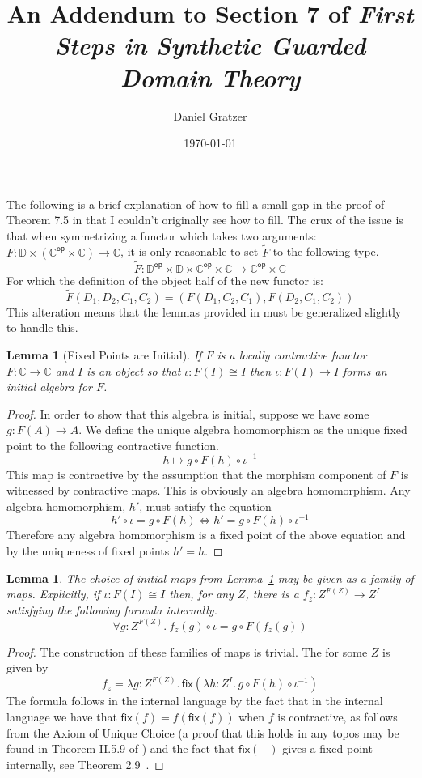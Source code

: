 \documentclass{amsart}
\title{An Addendum to Section 7 of \emph{First Steps in Synthetic
    Guarded Domain Theory}}
\author{Daniel Gratzer}
\date{\today}
\newtheorem{lem}[thm]{Lemma}
\newcommand{\Ccat}{\ensuremath{\mathbb{C}}}
\newcommand{\Dcat}{\ensuremath{\mathbb{D}}}
\newcommand{\op}[1]{\ensuremath{#1^{\mathsf{op}}}}
\newcommand{\symmetrize}[1]{\ensuremath{\widetilde{#1}}}
\newcommand{\fix}[1]{\ensuremath{\mathsf{fix}(#1)}}
\newcommand{\lam}[2]{\ensuremath{\lambda #1.\,#2}}
\begin{document}
\maketitle

The following is a brief explanation of how to fill a small gap in the
proof of Theorem 7.5 in \citet{Birkedal:11} that I couldn't originally
see how to fill. The crux of the issue is that when symmetrizing a
functor which takes two arguments:
$F : \Dcat \times (\op{\Ccat} \times \Ccat) \to \Ccat$, it is only
reasonable to set $\symmetrize{F}$ to the following type.
\[
  \symmetrize{F} : \op{\Dcat} \times \Dcat \times \op{\Ccat} \times \Ccat \to \op{\Ccat} \times \Ccat
\]
For which the definition of the object half of the new functor is:
\[
  \symmetrize{F}(D_1, D_2, C_1, C_2) = (F(D_1, C_2, C_1), F(D_2, C_1, C_2))
\]
This alteration means that the lemmas provided in \citet{Birkedal:11}
must be generalized slightly to handle this.
\begin{lem}[Fixed Points are Initial]\label{lem:initial}
  If $F$ is a locally contractive functor $F : \Ccat \to \Ccat$ and
  $I$ is an object so that $\iota : F(I) \cong I$ then
  $\iota : F(I) \to I$ forms an initial algebra for $F$.
\end{lem}
\begin{proof}
  In order to show that this algebra is initial, suppose we have some
  $g : F(A) \to A$. We define the unique algebra homomorphism as the
  unique fixed point to the following contractive function.
  \[
    h \mapsto g \circ F(h) \circ \iota^{-1}
  \]
  This map is contractive by the assumption that the morphism
  component of $F$ is witnessed by contractive maps. This is obviously
  an algebra homomorphism. Any algebra homomorphism, $h'$, must
  satisfy the equation
  \[
    h' \circ \iota = g \circ F(h) \iff
    h' = g \circ F(h) \circ \iota^{-1}
  \]
  Therefore any algebra homomorphism is a fixed point of the above
  equation and by the uniqueness of fixed points $h' = h$.
\end{proof}
\begin{lem}\label{lem:internal-choice}
  The choice of initial maps from Lemma~\ref{lem:initial} may be given
  as a family of maps. Explicitly, if $\iota : F(I) \cong I$ then, for
  any $Z$, there is a $f_z : Z^{F(Z)} \to Z^I$ satisfying the
  following formula internally.
  \[
    \forall g : Z^{F(Z)}.\ f_z(g) \circ \iota = g \circ F(f_z(g))
  \]
\end{lem}
\begin{proof}
  The construction of these families of maps is trivial. The for some
  $Z$ is given by
  \[
    f_z = \lam{g : Z^{F(Z)}}{\fix{\lam{h : Z^I}{g \circ F(h) \circ \iota^{-1}}}}
  \]
  The formula follows in the internal language by the fact that in the
  internal language we have that $\fix{f} = f(\fix{f})$ when $f$ is
  contractive, as follows from the Axiom of Unique Choice (a proof
  that this holds in any topos may be found in Theorem II.5.9 of
  \citet{Lambek:88}) and the fact that $\fix{-}$ gives a fixed point
  internally, see Theorem 2.9~\citep{Birkedal:11}.
\end{proof}
\end{document}
